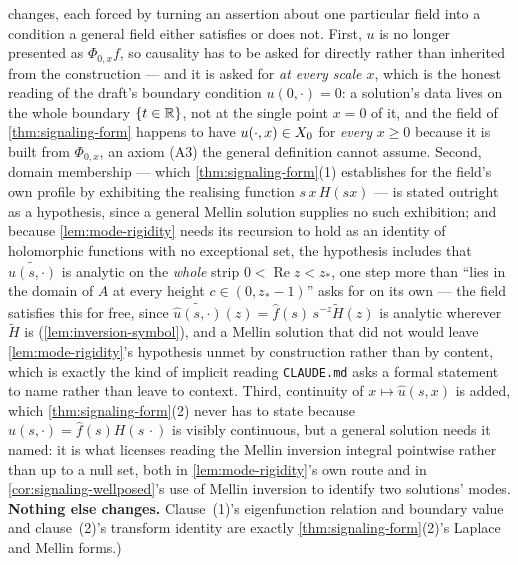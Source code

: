 \begin{definition}
{changes, each forced by turning an assertion about one particular field into a condition a general
field either satisfies or does not. First, $u$ is no longer presented as $\Phi_{0,x}f$, so
causality has to be asked for directly rather than inherited from the construction --- and it is
asked for \emph{at every scale $x$}, which is the honest reading of the draft's boundary condition
$u(0,\cdot)=0$: a solution's data lives on the whole boundary $\{t \in \mathbb{R}\}$, not at the single
point $x=0$ of it, and the field of \ref{thm:signaling-form} happens to have $u(\cdot,x) \in X_0$
for \emph{every} $x \ge 0$ because it is built from $\Phi_{0,x}$, an axiom (A3) the general
definition cannot assume. Second, domain membership --- which \ref{thm:signaling-form}(1)
establishes for the field's own profile by exhibiting the realising function $s\,x\,H(sx)$ --- is
stated outright as a hypothesis, since a general Mellin solution supplies no such exhibition; and
because \ref{lem:mode-rigidity} needs its recursion to hold as an identity of holomorphic functions
with no exceptional set, the hypothesis includes that $\widetilde{\hat u(s,\cdot)}$ is analytic on
the \emph{whole} strip $0<\operatorname{Re} z<z_*$, one step more than ``lies in the domain of $A$ at every
height $c \in (0,z_*-1)$'' asks for on its own --- the field satisfies this for free, since
$\widetilde{\hat u(s,\cdot)}(z) = \hat f(s)\,s^{-z}\tilde H(z)$ is analytic wherever $\tilde H$ is
(\ref{lem:inversion-symbol}), and a Mellin solution that did not would leave
\ref{lem:mode-rigidity}'s hypothesis unmet by construction rather than by content, which is exactly
the kind of implicit reading \texttt{CLAUDE.md} asks a formal statement to name rather than leave
to context. Third, continuity of $x \mapsto \hat u(s,x)$ is added, which
\ref{thm:signaling-form}(2) never has to state because $\hat u(s,\cdot) = \hat f(s)H(s\,\cdot)$ is
visibly continuous, but a general solution needs it named: it is what licenses reading the Mellin
inversion integral pointwise rather than up to a null set, both in \ref{lem:mode-rigidity}'s own
route and in \ref{cor:signaling-wellposed}'s use of Mellin inversion to identify two solutions'
modes.
\textbf{Nothing else changes.} Clause~(1)'s eigenfunction relation and boundary value and
clause~(2)'s transform identity are exactly \ref{thm:signaling-form}(2)'s Laplace and Mellin
forms.)}
\end{definition}

